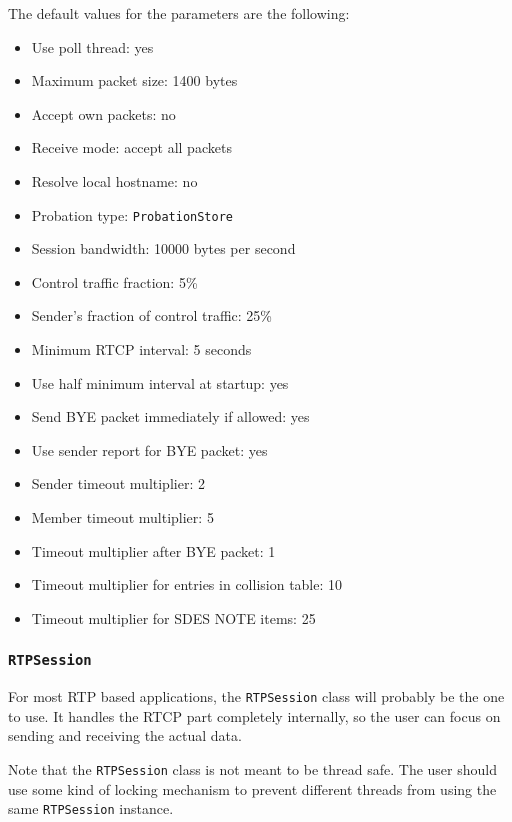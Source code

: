 \documentclass[12pt,a4paper]{article}
\newcommand{\headerfile}[1]{\marginpar{\scriptsize Header:\\{\tt #1}}}
\begin{document}
				The default values for the parameters are the following:
				\begin{itemize}
					\item Use poll thread: yes
					\item Maximum packet size: 1400 bytes
					\item Accept own packets: no
					\item Receive mode: accept all packets
					\item Resolve local hostname: no
					\item Probation type: {\tt ProbationStore}
					\item Session bandwidth: 10000 bytes per second
					\item Control traffic fraction: 5\%
					\item Sender's fraction of control traffic: 25\%
					\item Minimum RTCP interval: 5 seconds
					\item Use half minimum interval at startup: yes
					\item Send BYE packet immediately if allowed: yes
					\item Use sender report for BYE packet: yes
					\item Sender timeout multiplier: 2
					\item Member timeout multiplier: 5
					\item Timeout multiplier after BYE packet: 1
					\item Timeout multiplier for entries in collision table: 10
					\item Timeout multiplier for SDES NOTE items: 25
				\end{itemize}

			\subsubsection{\tt RTPSession}\headerfile{rtpsession.h}
			\label{rtpsession}
			
				For most RTP based applications, the {\tt RTPSession} class
				will probably be the one to use. It handles the RTCP part
				completely internally, so the user can focus on sending and
				receiving the actual data.
				
				Note that the {\tt RTPSession} class is not meant to be thread
				safe. The user should use some kind of locking mechanism to prevent
				different threads from using the same {\tt RTPSession} instance.
\end{document}
